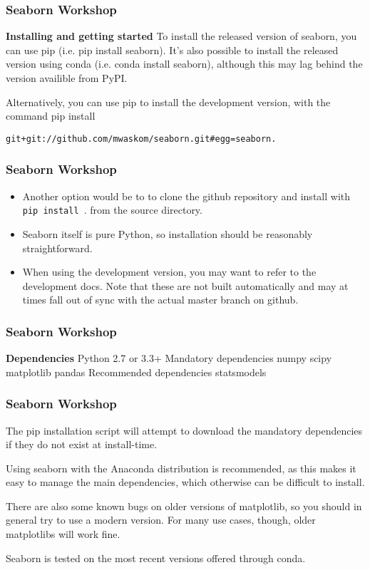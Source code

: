 \documentclass{beamer}
\begin{document}
\begin{frame}[fragile]
\frametitle{Seaborn Workshop}
\large
\textbf{Installing and getting started}
To install the released version of seaborn, you can use pip (i.e. pip install seaborn). It’s also possible to install the released version using conda (i.e. conda install seaborn), although this may lag behind the version availible from PyPI.

Alternatively, you can use pip to install the development version, with the command pip install
\begin{verbatim}
git+git://github.com/mwaskom/seaborn.git#egg=seaborn.
\end{verbatim}  
\end{frame}
\begin{frame}
	\frametitle{Seaborn Workshop}
	\large
\begin{itemize}
\item Another option would be to to clone the github repository and install with \texttt{pip install }. from the source directory. \item Seaborn itself is pure Python, so installation should be reasonably straightforward.

\item When using the development version, you may want to refer to the development docs. Note that these are not built automatically and may at times fall out of sync with the actual master branch on github.
\end{itemize}

\end{frame}
\begin{frame}
\frametitle{Seaborn Workshop}
\large
\noindent \textbf{Dependencies}
Python 2.7 or 3.3+
Mandatory dependencies
numpy
scipy
matplotlib
pandas
Recommended dependencies
statsmodels
\end{frame}
\begin{frame}
\frametitle{Seaborn Workshop}
\large

The pip installation script will attempt to download the mandatory dependencies if they do not exist at install-time.

Using seaborn with the Anaconda distribution is recommended, as this makes it easy to manage the main dependencies, which otherwise can be difficult to install.


There are also some known bugs on older versions of matplotlib, so you should in general try to use a modern version. For many use cases, though, older matplotlibs will work fine.

Seaborn is tested on the most recent versions offered through conda.
\end{frame}
\end{document}
